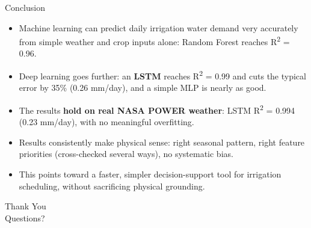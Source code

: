 \documentclass[11pt,aspectratio=169]{beamer}
\begin{document}
\begin{frame}{Conclusion}
  \begin{itemize}
    \item Machine learning can predict daily irrigation water demand very
      accurately from simple weather and crop inputs alone: Random Forest
      reaches R\textsuperscript{2} = 0.96.
    \item Deep learning goes further: an \textbf{LSTM} reaches
      R\textsuperscript{2} = 0.99 and cuts the typical error by 35\% (0.26
      mm/day), and a simple MLP is nearly as good.
    \item The results \textbf{hold on real NASA POWER weather}: LSTM
      R\textsuperscript{2} = 0.994 (0.23 mm/day), with no meaningful overfitting.
    \item Results consistently make physical sense: right seasonal pattern,
      right feature priorities (cross-checked several ways), no
      systematic bias.
    \item This points toward a faster, simpler decision-support tool for
      irrigation scheduling, without sacrificing physical grounding.
  \end{itemize}
\end{frame}

{
\begin{frame}[standout]
  Thank You \\
  \vspace{0.5em}
  {\normalsize Questions?}
\end{frame}
}
\end{document}
